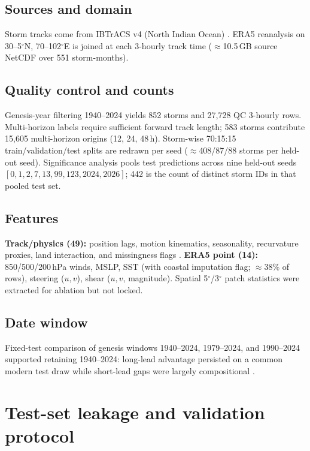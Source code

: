 \documentclass[11pt]{article}
\newcommand{\era}{ERA5}
\newcommand{\ibtracs}{IBTrACS}
\begin{document}
\subsection{Sources and domain}
Storm tracks come from \ibtracs{} v4 (North Indian Ocean) \cite{knapp2010,schreck2014}.
\era{} reanalysis \cite{hersbach2020} on 30--5$^\circ$N, 70--102$^\circ$E is joined at each 3-hourly track time ($\approx$10.5\,GB source NetCDF over 551 storm-months).

\subsection{Quality control and counts}
Genesis-year filtering 1940--2024 yields 852 storms and 27{,}728 QC 3-hourly rows.
Multi-horizon labels require sufficient forward track length; 583 storms contribute 15{,}605 multi-horizon origins (12, 24, 48\,h).
Storm-wise 70:15:15 train/validation/test splits are redrawn per seed ($\approx$408/87/88 storms per held-out seed).
Significance analysis pools test predictions across nine held-out seeds $[0,1,2,7,13,99,123,2024,2026]$; 442 is the count of distinct storm IDs in that pooled test set.

\subsection{Features}
\textbf{Track/physics (49):} position lags, motion kinematics, seasonality, recurvature proxies, land interaction, and missingness flags \cite{holland1983}.
\textbf{\era{} point (14):} 850/500/200\,hPa winds, MSLP, SST (with coastal imputation flag; $\approx$38\% of rows), steering ($u,v$), shear ($u,v$, magnitude).
Spatial 5$^\circ$/3$^\circ$ patch statistics were extracted for ablation but not locked.

\subsection{Date window}
Fixed-test comparison of genesis windows 1940--2024, 1979--2024, and 1990--2024 supported retaining 1940--2024: long-lead advantage persisted on a common modern test draw while short-lead gaps were largely compositional \cite{kossin2013,walsh2015}.

\section{Test-set leakage and validation protocol}
\label{sec:leakage}
\end{document}
